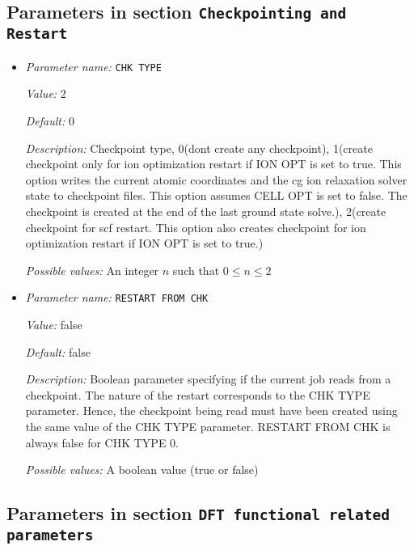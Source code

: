 \subsection{Parameters in section \tt Checkpointing and Restart}
\label{parameters:Checkpointing_20and_20Restart}

\begin{itemize}
\item {\it Parameter name:} {\tt CHK TYPE}
\label{parameters:Checkpointing and Restart/CHK TYPE}
\label{parameters:Checkpointing_20and_20Restart/CHK_20TYPE}


{\it Value:} 2


{\it Default:} 0


{\it Description:} Checkpoint type, 0(dont create any checkpoint), 1(create checkpoint only for ion optimization restart if ION OPT is set to true. This option writes the current atomic coordinates and the cg ion relaxation solver state to checkpoint files. This option assumes CELL OPT is set to false. The checkpoint is created at the end of the last ground state solve.), 2(create checkpoint for scf restart. This option also creates checkpoint for ion optimization restart if ION OPT is set to true.)


{\it Possible values:} An integer $n$ such that $0\leq n \leq 2$
\item {\it Parameter name:} {\tt RESTART FROM CHK}
\label{parameters:Checkpointing and Restart/RESTART FROM CHK}
\label{parameters:Checkpointing_20and_20Restart/RESTART_20FROM_20CHK}


{\it Value:} false


{\it Default:} false


{\it Description:} Boolean parameter specifying if the current job reads from a checkpoint. The nature of the restart corresponds to the CHK TYPE parameter. Hence, the checkpoint being read must have been created using the same value of the CHK TYPE parameter. RESTART FROM CHK is always false for CHK TYPE 0.


{\it Possible values:} A boolean value (true or false)
\end{itemize}

\subsection{Parameters in section \tt DFT functional related parameters}
\label{parameters:DFT_20functional_20related_20parameters}

